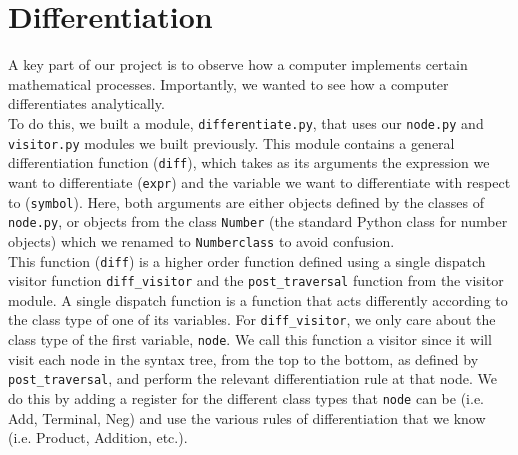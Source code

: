 \documentclass[12pt]{article}
\begin{document}
\section{Differentiation}
A key part of our project is to observe how a computer implements certain mathematical processes. Importantly, we wanted to see how a computer differentiates analytically. \\
To do this, we built a module, \texttt{differentiate.py}, that uses our \texttt{node.py} and \texttt{visitor.py} modules we built previously. This module contains a general differentiation function (\texttt{diff}), which takes as its arguments the expression we want to differentiate (\texttt{expr}) and the variable we want to differentiate with respect to (\texttt{symbol}). Here, both arguments are either objects defined by the classes of \texttt{node.py},
or objects from the class \texttt{Number} (the standard Python class for number objects) which we renamed to \texttt{Numberclass} to avoid confusion.\\
This function (\texttt{diff}) is a higher order function defined using a single dispatch visitor function \texttt{diff\_visitor} and the \texttt{post\_traversal} function from the visitor module.
A single dispatch function is a function that acts differently according to the class type of one of its variables. For \texttt{diff\_visitor}, we only care about the class type of the first variable, \texttt{node}.
We call this function a visitor since it will visit each node in the syntax tree, from the top to the bottom, as defined by \texttt{post\_traversal}, and perform the relevant differentiation rule at that node.
We do this by adding a register for the different class types that \texttt{node} can be (i.e. Add, Terminal, Neg) and use the various rules of differentiation that we know (i.e. Product, Addition, etc.). 
\end{document}
